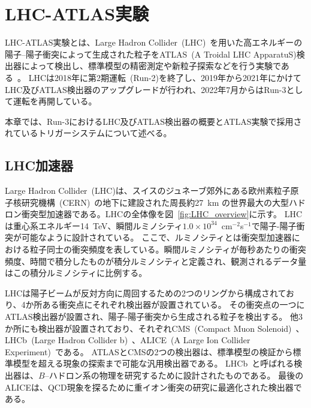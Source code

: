 \chapter{LHC-ATLAS実験}\label{chapter2}

LHC-ATLAS実験とは、Large Hadron Collider~(LHC)~\cite{article:LHC}を用いた高エネルギーの陽子–陽子衝突によって生成された粒子をATLAS~(A Troidal LHC ApparatuS)検出器によって検出し、標準模型の精密測定や新粒子探索などを行う実験である~\cite{Aad:1129811}。
LHCは2018年に第2期運転~(Run-2)を終了し、2019年から2021年にかけてLHC及びATLAS検出器のアップグレードが行われ、2022年7月からはRun-3として運転を再開している。

本章では、Run-3におけるLHC及びATLAS検出器の概要とATLAS実験で採用されているトリガーシステムについて述べる。

\section{LHC加速器}
\label{section2-1}
Large Hadron Collider~(LHC)は、スイスのジュネーブ郊外にある欧州素粒子原子核研究機構~(CERN)~\cite{article:CERN}の地下に建設された周長約27~km の世界最大の大型ハドロン衝突型加速器である。LHCの全体像を図~\ref{fig:LHC_overview}に示す。
LHCは重心系エネルギー14~TeV、瞬間ルミノシティ$1.0\times10^{34}$~cm$^{-2}$s$^{-1}$で陽子-陽子衝突が可能なように設計されている。
ここで、ルミノシティとは衝突型加速器における粒子同士の衝突頻度を表している。瞬間ルミノシティが毎秒あたりの衝突頻度、時間で積分したものが積分ルミノシティと定義され、観測されるデータ量はこの積分ルミノシティに比例する。

LHCは陽子ビームが反対方向に周回するための2つのリングから構成されており、4か所ある衝突点にそれぞれ検出器が設置されている。
その衝突点の一つにATLAS検出器が設置され、陽子-陽子衝突から生成される粒子を検出する。
他3か所にも検出器が設置されており、それぞれCMS~(Compact Muon Solenoid)~\cite{article:CMSExperiment}、LHCb~(Large Hadron Collider b)~\cite{article:LHCbExperiment}、ALICE~(A Large Ion Collider Experiment)~\cite{article:ALICEExperiment}である。
ATLASとCMSの2つの検出器は、標準模型の検証から標準模型を超える現象の探索まで可能な汎用検出器である。
LHCb~と呼ばれる検出器は、$B$--ハドロン系の物理を研究するために設計されたものである。
最後のALICEは、QCD現象を探るために重イオン衝突の研究に最適化された検出器である。



